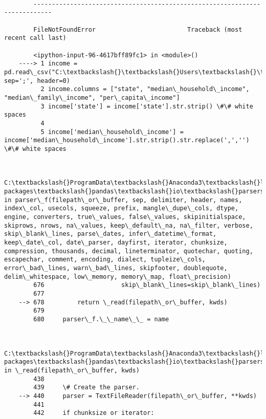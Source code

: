 \documentclass[11pt]{article}
\begin{document}
    \begin{Verbatim}[commandchars=\\\{\}]

        ---------------------------------------------------------------------------

        FileNotFoundError                         Traceback (most recent call last)

        <ipython-input-96-4617bff89fc1> in <module>()
    ----> 1 income = pd.read\_csv("C:\textbackslash{}\textbackslash{}Users\textbackslash{}\textbackslash{}Jeffr\textbackslash{}\textbackslash{}Downloads\textbackslash{}\textbackslash{}FDScase1\textbackslash{}\textbackslash{}income\_dataset.txt", sep=';', header=0)
          2 income.columns = ["state", "median\_household\_income", "median\_family\_income", "per\_capita\_income"]
          3 income['state'] = income['state'].str.strip() \#\# white spaces
          4 
          5 income['median\_household\_income'] = income['median\_household\_income'].str.strip().str.replace(',','') \#\# white spaces
    

        C:\textbackslash{}ProgramData\textbackslash{}Anaconda3\textbackslash{}lib\textbackslash{}site-packages\textbackslash{}pandas\textbackslash{}io\textbackslash{}parsers.py in parser\_f(filepath\_or\_buffer, sep, delimiter, header, names, index\_col, usecols, squeeze, prefix, mangle\_dupe\_cols, dtype, engine, converters, true\_values, false\_values, skipinitialspace, skiprows, nrows, na\_values, keep\_default\_na, na\_filter, verbose, skip\_blank\_lines, parse\_dates, infer\_datetime\_format, keep\_date\_col, date\_parser, dayfirst, iterator, chunksize, compression, thousands, decimal, lineterminator, quotechar, quoting, escapechar, comment, encoding, dialect, tupleize\_cols, error\_bad\_lines, warn\_bad\_lines, skipfooter, doublequote, delim\_whitespace, low\_memory, memory\_map, float\_precision)
        676                     skip\_blank\_lines=skip\_blank\_lines)
        677 
    --> 678         return \_read(filepath\_or\_buffer, kwds)
        679 
        680     parser\_f.\_\_name\_\_ = name
    

        C:\textbackslash{}ProgramData\textbackslash{}Anaconda3\textbackslash{}lib\textbackslash{}site-packages\textbackslash{}pandas\textbackslash{}io\textbackslash{}parsers.py in \_read(filepath\_or\_buffer, kwds)
        438 
        439     \# Create the parser.
    --> 440     parser = TextFileReader(filepath\_or\_buffer, **kwds)
        441 
        442     if chunksize or iterator:
    


\end{Verbatim}
\end{document}
